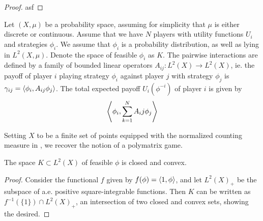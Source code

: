 \begin{proof}
	asf
\end{proof}
\begin{definition} \label{def:lin_game}
  Let $(X,\mu)$ be a probability space, assuming for simplicity that $\mu$ is either discrete or  continuous. Assume that we have $N$ players with utility functions $U_i$ and strategies $\phi_i$. We assume that $\phi_i$ is a probability distribution, as well as lying in $L^2(X,\mu)$. Denote the space of feasible $\phi_i$ as $K$. The pairwise interactions are defined by a family of bounded linear operators $A_{ij}: L^2(X)\to L^2(X)$, ie. the payoff of player $i$ playing strategy $\phi_i$ against player $j$ with strategy $\phi_j$ is $\gamma_{ij}=\ip{\phi_i}{A_{ij} \phi_j}$. The total expected payoff $U_i(\phi^{-i})$ of player $i$ is given by
  \begin{equation}
    \ip{\phi_i}{\sum_{k=1}^N A_ij \phi_j}
  \end{equation}
\end{definition}
\begin{remark}
  Setting $X$ to be a finite set of points equipped with the normalized counting measure in , we recover the notion of a polymatrix game.
\end{remark}
\begin{lemma}
  The space $K\subset L^2(X)$ of feasible $\phi$ is closed and convex.
\end{lemma}
\begin{proof}
  Consider the functional $f$ given by $f(\phi)=\ip{1}{\phi}$, and let $L^2(X)_+$ be the subspace of a.e. positive square-integrable functions. Then $K$ can be written as $f^{-1}(\{1\}) \cap L^2(X)_+$, an intersection of two closed and convex sets, showing the desired.
\end{proof}

